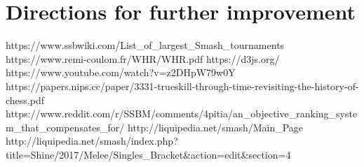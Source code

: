 \documentclass[10pt]{article}
\theoremstyle{definition}
\theoremstyle{remark}
\begin{document}
\section{Directions for further improvement}

\begin{thebibliography}{7}
 https://www.ssbwiki.com/List\_of\_largest\_Smash\_tournaments
 https://www.remi-coulom.fr/WHR/WHR.pdf 
 https://d3js.org/
 https://www.youtube.com/watch?v=z2DHpW79w0Y
 https://papers.nips.cc/paper/3331-trueskill-through-time-revisiting-the-history-of-chess.pdf
 https://www.reddit.com/r/SSBM/comments/4pitia/an\_objective\_ranking\_system\_that\_compensates\_for/
 http://liquipedia.net/smash/Main\_Page
 http://liquipedia.net/smash/index.php?title=Shine/2017/Melee/Singles\_Bracket\&action=edit\&section=4
\end{thebibliography}
\end{document}
